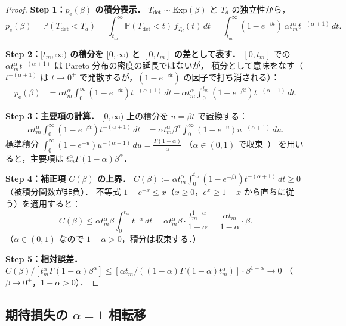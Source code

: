 \documentclass[12pt,a4paper]{article}
\theoremstyle{plain}
\theoremstyle{definition}
\theoremstyle{remark}
\newcommand{\Prob}{\mathbb{P}}
\newcommand{\pe}{p_{\mathrm{e}}}
\newcommand{\Tdet}{T_{\mathrm{det}}}
\begin{document}
\begin{proof}
\textbf{Step 1：$\pe(\beta)$ の積分表示．}
$\Tdet\sim\mathrm{Exp}(\beta)$ と $T_d$ の独立性から，
\begin{equation}\label{eq:pe_integral}
\pe(\beta)=\Prob(\Tdet<T_d)
=\int_{t_m}^\infty\Prob(\Tdet<t)\,f_{T_d}(t)\,dt
=\int_{t_m}^\infty(1-e^{-\beta t})\,\alpha t_m^\alpha t^{-(\alpha+1)}\,dt.
\end{equation}

\textbf{Step 2：$[t_m,\infty)$ の積分を $[0,\infty)$ と $[0,t_m]$ の差として表す．}
$[0,t_m]$ での $\alpha t_m^\alpha t^{-(\alpha+1)}$ は Pareto 分布の密度の延長ではないが，
積分として意味をなす（$t^{-(\alpha+1)}$ は $t\to0^+$ で発散するが，$(1-e^{-\beta t})$ の因子で打ち消される）：
\begin{align}
\pe(\beta)
&=\alpha t_m^\alpha\!\int_0^\infty(1-e^{-\beta t})t^{-(\alpha+1)}\,dt
-\alpha t_m^\alpha\!\int_0^{t_m}(1-e^{-\beta t})t^{-(\alpha+1)}\,dt.\label{eq:split}
\end{align}

\textbf{Step 3：主要項の計算．}
$[0,\infty)$ 上の積分を $u=\beta t$ で置換する：
\begin{align*}
\alpha t_m^\alpha\!\int_0^\infty(1-e^{-\beta t})t^{-(\alpha+1)}\,dt
&=\alpha t_m^\alpha\beta^\alpha\!\int_0^\infty(1-e^{-u})u^{-(\alpha+1)}\,du.
\end{align*}
標準積分
$\int_0^\infty(1-e^{-u})u^{-(\alpha+1)}\,du=\frac{\Gamma(1-\alpha)}{\alpha}$
（$\alpha\in(0,1)$ で収束~\cite{feller1971,bingham1989}）
を用いると，主要項は $t_m^\alpha\Gamma(1-\alpha)\beta^\alpha$．

\textbf{Step 4：補正項 $C(\beta)$ の上界．}
$C(\beta):=\alpha t_m^\alpha\int_0^{t_m}(1-e^{-\beta t})t^{-(\alpha+1)}\,dt\ge0$（被積分関数が非負）．
不等式 $1-e^{-x}\le x$（$x\ge0$，$e^x\ge1+x$ から直ちに従う）を適用すると：
\[
C(\beta)\le\alpha t_m^\alpha\beta\int_0^{t_m}t^{-\alpha}\,dt
=\alpha t_m^\alpha\beta\cdot\frac{t_m^{1-\alpha}}{1-\alpha}
=\frac{\alpha t_m}{1-\alpha}\cdot\beta.
\]
（$\alpha\in(0,1)$ なので $1-\alpha>0$，積分は収束する．）

\textbf{Step 5：相対誤差．}
$C(\beta)/[t_m^\alpha\Gamma(1-\alpha)\beta^\alpha]
\le[\alpha t_m/((1-\alpha)\Gamma(1-\alpha)t_m^\alpha)]\cdot\beta^{1-\alpha}\to0$
（$\beta\to0^+$，$1-\alpha>0$）．
\end{proof}

\subsection{期待損失の $\alpha=1$ 相転移}
\end{document}

